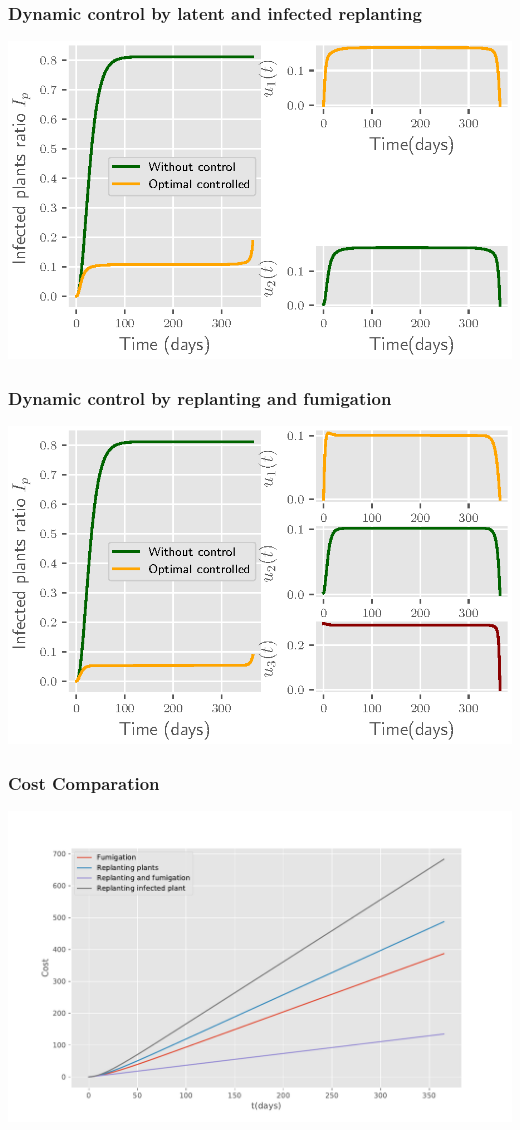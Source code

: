 	\begin{frame}[plain]
		\frametitle{Dynamic control by latent and infected replanting}
			\centering	
			\includegraphics[]{Feathergraphics/two_control_simulation_1.eps}
	
	\end{frame}
	\begin{frame}
			\frametitle{Dynamic control by replanting and fumigation}
			\centering	
			\includegraphics[]{Feathergraphics/three_controls_simulation_1.eps}
	
	\end{frame}

\begin{frame}[plain]

		\frametitle{Cost Comparation}
		\centering	
		\includegraphics[scale=0.5]{Feathergraphics/Cost_Comparation_version_2.pdf}
	
\end{frame}

